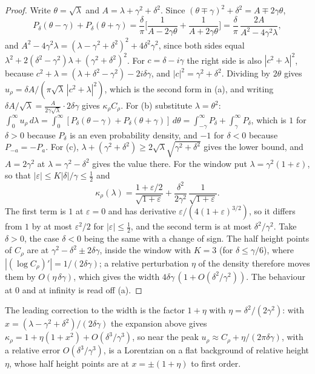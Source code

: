 \begin{proof}
Write $\theta=\sqrt\lambda$ and $A=\lambda+\gamma^2+\delta^2$. Since $(\theta\mp\gamma)^2+\delta^2=A\mp2\gamma\theta$,
\[
P_\delta(\theta-\gamma)+P_\delta(\theta+\gamma)=\frac\delta\pi\Big[\frac1{A-2\gamma\theta}+\frac1{A+2\gamma\theta}\Big]=\frac\delta\pi\,\frac{2A}{A^2-4\gamma^2\lambda},
\]
and $A^2-4\gamma^2\lambda=(\lambda-\gamma^2+\delta^2)^2+4\delta^2\gamma^2$, since both sides equal $\lambda^2+2(\delta^2-\gamma^2)\lambda+(\gamma^2+\delta^2)^2$. For $c=\delta-i\gamma$ the right side is also $|c^2+\lambda|^2$, because $c^2+\lambda=(\lambda+\delta^2-\gamma^2)-2i\delta\gamma$, and $|c|^2=\gamma^2+\delta^2$. Dividing by $2\theta$ gives $u_\rho=\delta A/(\pi\sqrt\lambda\,|c^2+\lambda|^2)$, which is the second form in (a), and writing $\delta A/\sqrt\lambda=\frac A{2\gamma\sqrt\lambda}\cdot2\delta\gamma$ gives $\kappa_\rho C_\rho$. For (b) substitute $\lambda=\theta^2$: $\int_0^\infty u_\rho\,d\lambda=\int_0^\infty[P_\delta(\theta-\gamma)+P_\delta(\theta+\gamma)]\,d\theta=\int_{-\gamma}^\infty P_\delta+\int_\gamma^\infty P_\delta$, which is $1$ for $\delta>0$ because $P_\delta$ is an even probability density, and $-1$ for $\delta<0$ because $P_{-a}=-P_a$. For (c), $\lambda+(\gamma^2+\delta^2)\ge2\sqrt\lambda\sqrt{\gamma^2+\delta^2}$ gives the lower bound, and $A=2\gamma^2$ at $\lambda=\gamma^2-\delta^2$ gives the value there. For the window put $\lambda=\gamma^2(1+\varepsilon)$, so that $|\varepsilon|\le K|\delta|/\gamma\le\frac12$ and
\[
\kappa_\rho(\lambda)=\frac{1+\varepsilon/2}{\sqrt{1+\varepsilon}}+\frac{\delta^2}{2\gamma^2}\,\frac1{\sqrt{1+\varepsilon}} .
\]
The first term is $1$ at $\varepsilon=0$ and has derivative $\varepsilon/(4(1+\varepsilon)^{3/2})$, so it differs from $1$ by at most $\varepsilon^2/2$ for $|\varepsilon|\le\frac12$, and the second term is at most $\delta^2/\gamma^2$. Take $\delta>0$, the case $\delta<0$ being the same with a change of sign. The half height points of $C_\rho$ are at $\gamma^2-\delta^2\pm2\delta\gamma$, inside the window with $K=3$ (for $\delta\le\gamma/6$), where $|(\log C_\rho)'|=1/(2\delta\gamma)$; a relative perturbation $\eta$ of the density therefore moves them by $O(\eta\,\delta\gamma)$, which gives the width $4\delta\gamma\,(1+O(\delta^2/\gamma^2))$. The behaviour at $0$ and at infinity is read off (a).
\end{proof}

\begin{remark}
The leading correction to the width is the factor $1+\eta$ with $\eta=\delta^2/(2\gamma^2)$: with $x=(\lambda-\gamma^2+\delta^2)/(2\delta\gamma)$ the expansion above gives $\kappa_\rho=1+\eta(1+x^2)+O(\delta^3/\gamma^3)$, so near the peak $u_\rho\approx C_\rho+\eta/(2\pi\delta\gamma)$, with a relative error $O(\delta^3/\gamma^3)$, is a Lorentzian on a flat background of relative height $\eta$, whose half height points are at $x=\pm(1+\eta)$ to first order.
\end{remark}

